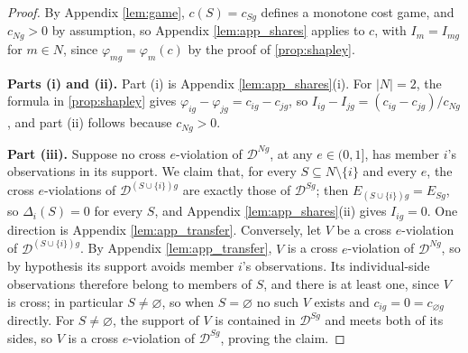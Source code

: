\documentclass[11 pt]{article}
\begin{document}
\begin{proof}
By Appendix \autoref{lem:game}, $c(S) = c_{Sg}$ defines a monotone cost game, and $c_{Ng} > 0$ by assumption, so Appendix \autoref{lem:app_shares} applies to $c$, with $I_{m} = I_{mg}$ for $m \in N$, since $\varphi_{mg} = \varphi_{m}(c)$ by the proof of \autoref{prop:shapley}.

\textbf{Parts (i) and (ii).} Part (i) is Appendix \autoref{lem:app_shares}(i). For $|N| = 2$, the formula in \autoref{prop:shapley} gives $\varphi_{ig} - \varphi_{jg} = c_{ig} - c_{jg}$, so $I_{ig} - I_{jg} = (c_{ig} - c_{jg})/c_{Ng}$, and part (ii) follows because $c_{Ng} > 0$.

\textbf{Part (iii).} Suppose no cross $e$-violation of $\mathcal{D}^{Ng}$, at any $e \in (0,1]$, has member $i$'s observations in its support. We claim that, for every $S \subseteq N \setminus \{i\}$ and every $e$, the cross $e$-violations of $\mathcal{D}^{(S \cup \{i\})g}$ are exactly those of $\mathcal{D}^{Sg}$; then $E_{(S \cup \{i\})g} = E_{Sg}$, so $\Delta_{i}(S) = 0$ for every $S$, and Appendix \autoref{lem:app_shares}(ii) gives $I_{ig} = 0$. One direction is Appendix \autoref{lem:app_transfer}. Conversely, let $V$ be a cross $e$-violation of $\mathcal{D}^{(S \cup \{i\})g}$. By Appendix \autoref{lem:app_transfer}, $V$ is a cross $e$-violation of $\mathcal{D}^{Ng}$, so by hypothesis its support avoids member $i$'s observations. Its individual-side observations therefore belong to members of $S$, and there is at least one, since $V$ is cross; in particular $S \neq \varnothing$, so when $S = \varnothing$ no such $V$ exists and $c_{ig} = 0 = c_{\varnothing g}$ directly. For $S \neq \varnothing$, the support of $V$ is contained in $\mathcal{D}^{Sg}$ and meets both of its sides, so $V$ is a cross $e$-violation of $\mathcal{D}^{Sg}$, proving the claim.


\end{proof}
\end{document}
